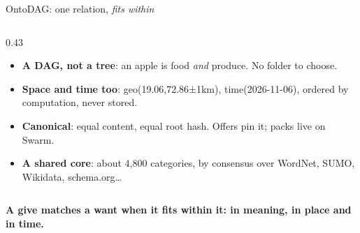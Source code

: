 \documentclass[aspectratio=169,11pt]{beamer}
\newcommand{\code}[1]{{\ttfamily #1}}
\begin{document}
{\begin{frame}{OntoDAG: one relation, \emph{fits within}}
\begin{columns}[T]
\begin{column}{0.43\textwidth}
      \small
      \begin{itemize}\setlength{\itemsep}{1.2mm}
        \item \textbf{A DAG, not a tree}: an apple is food \emph{and} produce. No folder to choose.
        \item \textbf{Space and time too}: \code{geo(19.06,72.86±1km)}, \code{time(2026-11-06)}, ordered by computation, never stored.
        \item \textbf{Canonical}: equal content, equal root hash. Offers pin it; packs live on Swarm.
        \item \textbf{A shared core}: about 4,800 categories, by consensus over WordNet, SUMO, Wikidata, schema.org\dots
      \end{itemize}
    \end{column}
  \end{columns}
  \vspace{1mm}
  {\small\color{accent}\bfseries A give matches a want when it fits within it: in meaning, in place and in time.\par}
\end{frame}
}
\end{document}
